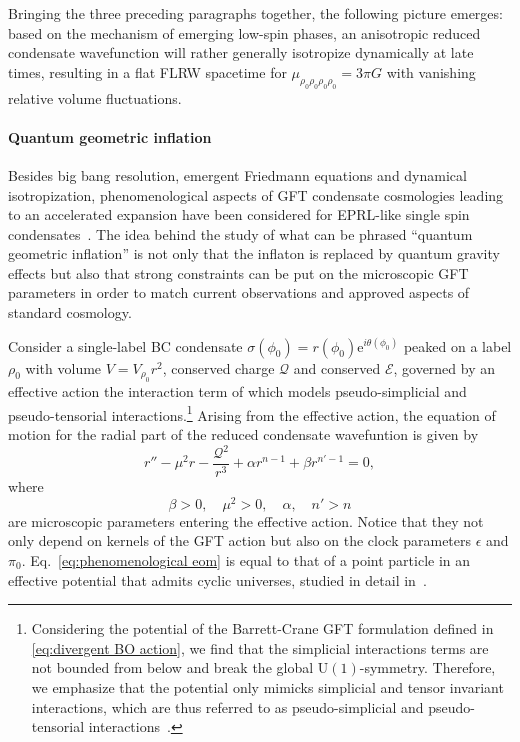 \documentclass[11pt,a4paper]{article}
\newcommand{\e}{\textrm{e}}
\begin{document}
Bringing the three preceding paragraphs together, the following picture emerges: based on the mechanism of emerging low-spin phases, an anisotropic reduced condensate wavefunction will rather generally isotropize dynamically at late times, resulting in a flat FLRW spacetime for $\mu_{\rho_0 \rho_0 \rho_0 \rho_0} = 3\pi G$ with vanishing relative volume fluctuations.

\paragraph{Quantum geometric inflation}

Besides big bang resolution, emergent Friedmann equations and dynamical isotropization, phenomenological aspects of GFT condensate cosmologies leading to an accelerated expansion have been considered for EPRL-like single spin condensates~\cite{deCesare:2016rsf,Pithis:2016cxg}. The idea behind the study of what can be phrased \enquote{quantum geometric inflation} is not only that the inflaton is replaced by quantum gravity effects but also that strong constraints can be put on the microscopic GFT parameters in order to match current observations and approved aspects of standard cosmology. 

Consider a single-label BC condensate $\sigma(\phi_0)=r(\phi_0)\e^{i\theta(\phi_0)}$ peaked on a label $\rho_0$ with volume $V = V_{\rho_0}r^2$, conserved charge $\mathcal{Q}$ and conserved $\mathcal{E}$, governed by an effective action the interaction term of which models pseudo-simplicial and pseudo-tensorial interactions.\footnote{Considering the potential of the Barrett-Crane GFT formulation defined in \eqref{eq:divergent BO action}, we find that the simplicial interactions terms are not bounded from below and break the global $\text{U}(1)$-symmetry.  Therefore, we emphasize that the potential only mimicks simplicial and tensor invariant interactions, which are thus referred to as pseudo-simplicial and pseudo-tensorial interactions~\cite{deCesare:2016rsf}.} Arising from the effective action, the equation of motion for the radial part of the reduced condensate wavefuntion is given by
%
\begin{equation}\label{eq:phenomenological eom}
r''-\mu^2 r-\frac{\mathcal{Q}^2}{r^3}+\alpha r^{n-1}+\beta r^{n'-1} = 0,
\end{equation}
%
where
\begin{equation}
\beta > 0,\quad \mu^2 >0,\quad \alpha,\quad n'>n
\end{equation}
%
are microscopic parameters entering the effective action. Notice that they not only depend on kernels of the GFT action but also on the clock parameters $\epsilon$ and $\pi_0$. Eq.~\eqref{eq:phenomenological eom} is equal to that of a point particle in an effective potential that admits cyclic universes, studied in detail in~\cite{deCesare:2016rsf}. 
\end{document}
